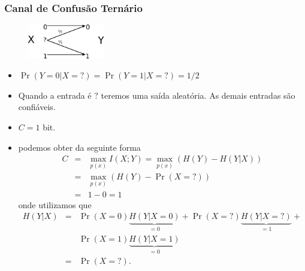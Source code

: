 \begin{frame}[allowframebreaks]
  \frametitle{Canal de Confusão Ternário}
                \begin{figure}[h!]
                \centering
                \includegraphics[width=0.3\textwidth]{images/tcc.pdf}
                \label{fig:tcc}
                \end{figure}
  \begin{itemize}
  \item $\Pr(Y=0 | X=?) = \Pr(Y=1 | X=?) = 1/2$
  \item Quando a entrada é $?$ teremos uma saída aleatória. As demais entradas são confiáveis.
  \item $C = 1$ bit.
  \item podemos obter da seguinte forma
  \begin{eqnarray}
  C &=& \max_{p(x)} I(X;Y) = \max_{p(x)} \left( H(Y) - H(Y|X) \right) \nonumber \\
    &=& \max_{p(x)} \left( H(Y) - \Pr(X = ?) \right) \nonumber \\
    &=& 1 - 0 = 1
  \end{eqnarray}
  onde utilizamos que
  \begin{eqnarray}
  H(Y|X) &=& \Pr(X=0) \underbrace{H(Y|X=0)}_{=0} + \Pr(X=?) \underbrace{H(Y|X=?)}_{=1} + \nonumber \\
	&& \Pr(X=1) \underbrace{H(Y|X=1)}_{=0} \nonumber \\
	&=& \Pr(X=?) .
  \end{eqnarray}
  \end{itemize}
\end{frame}


